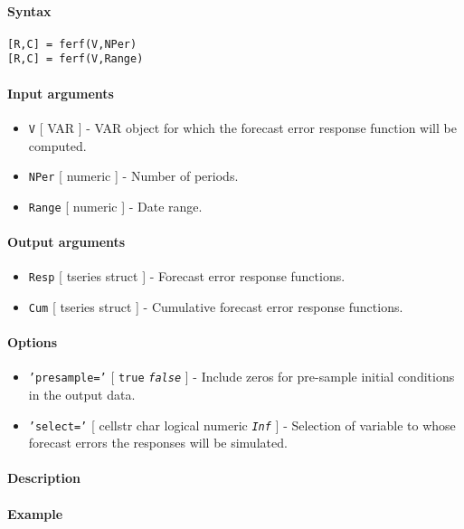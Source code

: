 


	\paragraph{Syntax}

\begin{verbatim}
[R,C] = ferf(V,NPer)
[R,C] = ferf(V,Range)
\end{verbatim}

\paragraph{Input arguments}

\begin{itemize}
\item
  \texttt{V} {[} VAR {]} - VAR object for which the forecast error
  response function will be computed.
\item
  \texttt{NPer} {[} numeric {]} - Number of periods.
\item
  \texttt{Range} {[} numeric {]} - Date range.
\end{itemize}

\paragraph{Output arguments}

\begin{itemize}
\item
  \texttt{Resp} {[} tseries \textbar{} struct {]} - Forecast error
  response functions.
\item
  \texttt{Cum} {[} tseries \textbar{} struct {]} - Cumulative forecast
  error response functions.
\end{itemize}

\paragraph{Options}

\begin{itemize}
\item
  \texttt{'presample='} {[} \texttt{true} \textbar{}
  \emph{\texttt{false}} {]} - Include zeros for pre-sample initial
  conditions in the output data.
\item
  \texttt{'select='} {[} cellstr \textbar{} char \textbar{} logical
  \textbar{} numeric \textbar{} \emph{\texttt{Inf}} {]} - Selection of
  variable to whose forecast errors the responses will be simulated.
\end{itemize}

\paragraph{Description}

\paragraph{Example}


